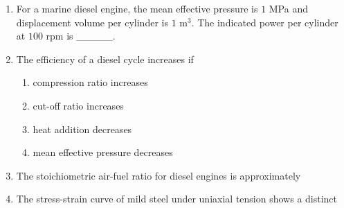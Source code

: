 \documentclass[journal,12pt,onecolumn]{IEEEtran}
\theoremstyle{remark}
\begin{document}
\begin{enumerate}
\item For a marine diesel engine, the mean effective pressure is $1$ MPa and displacement volume per cylinder is $1$ m$^3$.  
The indicated power per cylinder at $100$ rpm is \_\_\_\_\_.\hfill{}

\begin{enumerate}[label=\Alph*.]
\end{enumerate}

\item The efficiency of a diesel cycle increases if\hfill{}

\begin{enumerate}[label=\Alph*.]
\item compression ratio increases
\item cut-off ratio increases
\item heat addition decreases
\item mean effective pressure decreases
\end{enumerate}

\item The stoichiometric air-fuel ratio for diesel engines is approximately\hfill{}

\begin{enumerate}[label=\Alph*.]
\end{enumerate}

\item The stress-strain curve of mild steel under uniaxial tension shows a distinct\hfill{}

\begin{enumerate}[label=\Alph*.]
\end{enumerate}


\end{enumerate}
\end{document}
